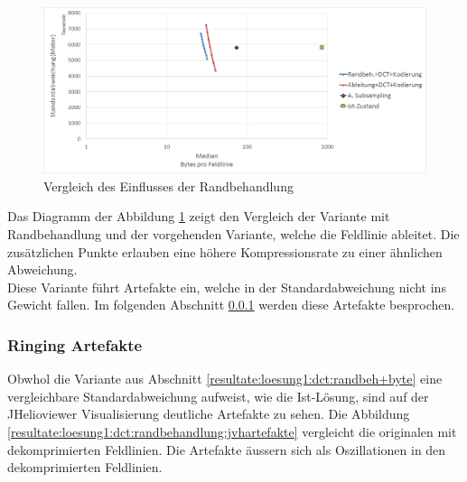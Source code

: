 \begin{figure}[!htbp]
	\center	\includegraphics[width=1\textwidth,keepaspectratio]{./pictures/resultate/loesung1/loesung1-7/loesung1_7.png}
	\caption{Vergleich des Einflusses der Randbehandlung}
	\label{resultate:loesung1:dct:randbehandlung}
\end{figure}
Das Diagramm der Abbildung \ref{resultate:loesung1:dct:randbehandlung} zeigt den Vergleich der Variante mit Randbehandlung und der vorgehenden Variante, welche die Feldlinie ableitet. Die zusätzlichen Punkte erlauben eine höhere Kompressionsrate zu einer ähnlichen Abweichung.\\
Diese Variante führt Artefakte ein, welche in der Standardabweichung nicht ins Gewicht fallen. Im folgenden Abschnitt \ref{resultate:loesung1:ringing} werden diese Artefakte besprochen.

\subsubsection{Ringing Artefakte}\label{resultate:loesung1:ringing}
Obwhol die Variante aus Abschnitt \ref{resultate:loesung1:dct:randbeh+byte} eine vergleichbare Standardabweichung aufweist, wie die Ist-Lösung, sind auf der JHelioviewer Visualisierung deutliche Artefakte zu sehen. Die Abbildung \ref{resultate:loesung1:dct:randbehandlung:jvhartefakte} vergleicht die originalen mit dekomprimierten Feldlinien. Die Artefakte äussern sich als Oszillationen in den dekomprimierten Feldlinien.

